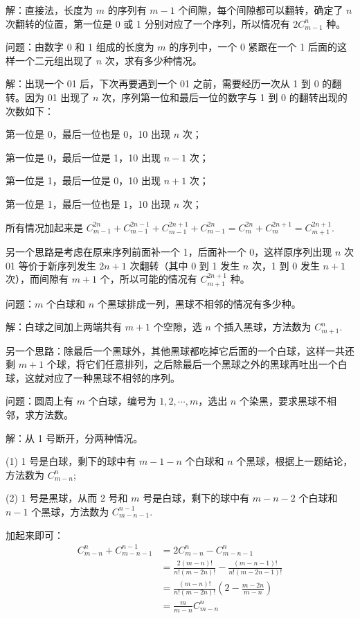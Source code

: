 解：直接法，长度为 $ m $ 的序列有 $ m - 1 $ 个间隙，每个间隙都可以翻转，确定了 $ n $ 次翻转的位置，第一位是 0 或 1 分别对应了一个序列，所以情况有 $ 2 C_{m-1}^n $ 种。

\vbox{}

问题：由数字 0 和 1 组成的长度为 $ m $ 的序列中，一个 0 紧跟在一个 1 后面的这样一个二元组出现了 $ n $ 次，求有多少种情况。

解：出现一个 01 后，下次再要遇到一个 01 之前，需要经历一次从 1 到 0 的翻转。因为 01 出现了 $ n $ 次，序列第一位和最后一位的数字与 1 到 0 的翻转出现的次数如下：

第一位是 0，最后一位也是 0，10 出现 $ n $ 次；

第一位是 0，最后一位是 1，10 出现 $ n - 1 $ 次；

第一位是 1，最后一位是 0，10 出现 $ n + 1 $ 次；

第一位是 1，最后一位也是 1，10 出现 $ n $ 次；

\noindent 所有情况加起来是 $ C_{m-1}^{2n} + C_{m-1}^{2n-1} + C_{m-1}^{2n+1} + C_{m-1}^{2n} = C_m^{2n} + C_m^{2n+1} = C_{m+1}^{2n+1} $.

另一个思路是考虑在原来序列前面补一个 1，后面补一个 0，这样原序列出现 $ n $ 次 01 等价于新序列发生 $ 2n+1 $ 次翻转（其中 0 到 1 发生 $ n $ 次，1 到 0 发生 $ n + 1 $ 次），而间隙有 $ m + 1 $ 个，所以可能的情况有 $ C_{m+1}^{2n+1} $ 种。

\vbox{}

问题：$ m $ 个白球和 $ n $ 个黑球排成一列，黑球不相邻的情况有多少种。

解：白球之间加上两端共有 $ m + 1$ 个空隙，选 $ n $ 个插入黑球，方法数为 $ C_{m+1}^n $.

另一个思路：除最后一个黑球外，其他黑球都吃掉它后面的一个白球，这样一共还剩 $ m + 1 $ 个球，将它们任意排列，之后除最后一个黑球之外的黑球再吐出一个白球，这就对应了一种黑球不相邻的序列。

\vbox{}

问题：圆周上有 $ m $ 个白球，编号为 $ 1,2,\cdots,m $，选出 $ n $ 个染黑，要求黑球不相邻，求方法数。

解：从 1 号断开，分两种情况。

(1) 1 号是白球，剩下的球中有 $ m - 1 - n $ 个白球和 $ n $ 个黑球，根据上一题结论，方法数为 $ C_{m-n}^n $;

(2) 1 号是黑球，从而 2 号和 $ m $ 号是白球，剩下的球中有 $ m - n - 2 $ 个白球和 $ n - 1 $ 个黑球，方法数为 $ C_{m-n-1}^{n-1} $.

加起来即可：
\begin{align*}
C_{m-n}^n + C_{m-n-1}^{n-1} &= 2C_{m-n}^n - C_{m-n-1}^n \\
& = \frac{2(m-n)!}{n!(m-2n)!} - \frac{(m-n-1)!}{n!(m-2n-1)!} \\
& = \frac{(m-n)!}{n!(m-2n)!}(2-\frac{m-2n}{m-n}) \\ 
& = \frac{m}{m-n} C_{m-n}^n
\end{align*}

